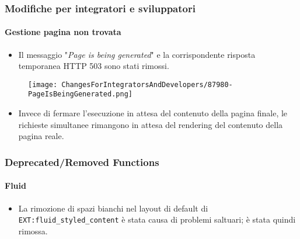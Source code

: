 
\begin{frame}[fragile]
	\frametitle{Modifiche per integratori e sviluppatori}
	\framesubtitle{Gestione pagina non trovata}

	\begin{itemize}

		\item Il messaggio "\textit{Page is being generated}" e la corrispondente risposta temporanea
			HTTP 503 sono stati rimossi.
	\end{itemize}

	\begin{figure}
		\texttt{[image: ChangesForIntegratorsAndDevelopers/87980-PageIsBeingGenerated.png]}
	\end{figure}

	\begin{itemize}
		\item Invece di fermare l'esecuzione in attesa del contenuto della pagina finale, le richieste simultanee
		rimangono in attesa del rendering del contenuto della pagina reale.
	\end{itemize}

\end{frame}


\begin{frame}[fragile]
	\frametitle{Deprecated/Removed Functions}
	\framesubtitle{Fluid}

	\begin{itemize}
		\item La rimozione di spazi bianchi nel layout di default di \texttt{EXT:fluid\_styled\_content}
			è stata causa di problemi saltuari; è stata quindi rimossa.

	\end{itemize}

\end{frame}


